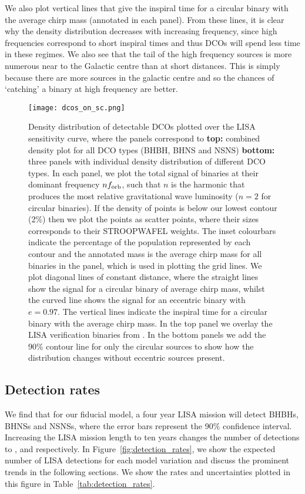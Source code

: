 We also plot vertical lines that give the inspiral time for a circular binary with the average chirp mass (annotated in each panel). From these lines, it is clear why the density distribution decreases with increasing frequency, since high frequencies correspond to short inspiral times and thus DCOs will spend less time in these regimes. We also see that the tail of the high frequency sources is more numerous near to the Galactic centre than at short distances. This is simply because there are more sources in the galactic centre and so the chances of `catching' a binary at high frequency are better.

\begin{figure*}[tp]
    \centering
    \texttt{[image: dcos\_on\_sc.png]}
    \caption{Density distribution of detectable DCOs plotted over the LISA sensitivity curve, where the panels correspond to \textbf{top:} combined density plot for all DCO types (BHBH, BHNS and NSNS) \textbf{bottom:} three panels with individual density distribution of different DCO types. In each panel, we plot the total signal of binaries at their dominant frequency $n f_{\rm orb}$, such that $n$ is the harmonic that produces the most relative gravitational wave luminosity ($n = 2$ for circular binaries). If the density of points is below our lowest contour (2\%) then we plot the points as scatter points, where their sizes corresponds to their STROOPWAFEL weights. The inset colourbars indicate the percentage of the population represented by each contour and the annotated mass is the average chirp mass for all binaries in the panel, which is used in plotting the grid lines. We plot diagonal lines of constant distance, where the straight lines show the signal for a circular binary of average chirp mass, whilst the curved line shows the signal for an eccentric binary with $e = 0.97$. The vertical lines indicate the inspiral time for a circular binary with the average chirp mass. In the top panel we overlay the LISA verification binaries from \citet{Kupfer+2018}. In the bottom panels we add the 90\% contour line for only the circular sources to show how the distribution changes without eccentric sources present.}
    \label{fig:dcos_on_sc}
\end{figure*}

\subsection{Detection rates}\label{sec:detection_rate_analysis}
We find that for our fiducial model, a four year LISA mission will detect  BHBHs,  BHNSs and  NSNSs, where the error bars represent the 90\% confidence interval. Increasing the LISA mission length to ten years changes the number of detections to ,  and  respectively. In Figure~\ref{fig:detection_rates}, we show the expected number of LISA detections for each model variation and discuss the prominent trends in the following sections. We show the rates and uncertainties plotted in this figure in Table~\ref{tab:detection_rates}.

